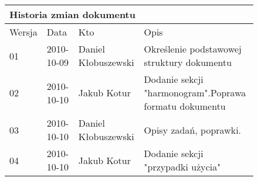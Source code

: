 \begin{figure}[h]
	\centering

\begin{tabular}{|p{}|p{}|p{}|p{}|}
	\hline
	\multicolumn{4}{|l|}{Historia zmian dokumentu} \\
	\hline
	Wersja & Data & Kto & Opis \\
	\hline
	01 & 2010-10-09 & Daniel Kłobuszewski &
	Określenie podstawowej struktury dokumentu \\
	\hline
	02 & 2010-10-10 & Jakub Kotur &
	Dodanie sekcji "harmonogram".\newline  Poprawa formatu dokumentu \\
	\hline
	03 & 2010-10-10 & Daniel Kłobuszewski &
	Opisy zadań, poprawki. \\
	\hline
	04 & 2010-10-10 & Jakub Kotur &
	Dodanie sekcji "przypadki użycia" \\
	\hline
\end{tabular}

	\label{tab:metric}
\end{figure}

